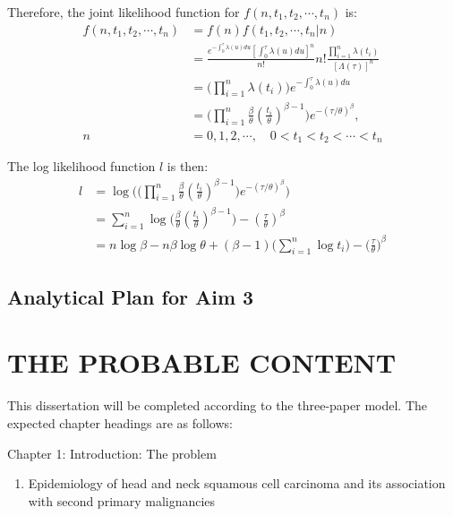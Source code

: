 \documentclass[12pt]{book}
\numberwithin{equation}{chapter}
\providecommand{\tightlist}{%
  \setlength{\itemsep}{0pt}\setlength{\parskip}{0pt}}
\begin{document}
Therefore, the joint likelihood function for \(f(n, t_1, t_2, \cdots, t_n)\) is:
\begin{equation}\label{pdftau}
\begin{aligned}
f(n, t_1, t_2, \cdots, t_n) & = f(n)f(t_1, t_2, \cdots, t_n|n)\\
& = \frac{e^{-\int_0^\tau \lambda(u)du}[\int_0^\tau \lambda(u)du]^n}{n!}n!\frac{\prod_{i=1}^n\lambda(t_i)}{[\Lambda(\tau)]^n}\\
& = \Big(\prod_{i=1}^n\lambda(t_i) \Big)e^{-\int_0^\tau \lambda(u)du}\\
& = \Big(\prod_{i=1}^n\frac{\beta}{\theta}(\frac{t_i}{\theta})^{\beta - 1} \Big)e^{-(\tau/\theta)^\beta},\\ 
n & = 0, 1, 2, \cdots, \quad  0 < t_1 < t_2 < \cdots < t_n
\end{aligned}
\end{equation}

The log likelihood function \(l\) is then:
\begin{equation}\label{logtau}
\begin{aligned}
l & = \log \Bigg(\Big(\prod_{i=1}^n\frac{\beta}{\theta}(\frac{t_i}{\theta})^{\beta - 1}\Big)e^{-(\tau/\theta)^\beta}\Bigg)\\
& = \sum_{i=1}^n\log\Big(\frac{\beta}{\theta}(\frac{t_i}{\theta})^{\beta - 1}\Big) - (\frac{\tau}{\theta})^\beta\\
& = n\log\beta - n\beta\log\theta + (\beta - 1)\bigg(\sum_{i=1}^n\log t_i\bigg) - \Big(\frac{\tau}{\theta}\Big)^\beta
\end{aligned}
\end{equation}

\hypertarget{analytical-plan-for-aim-3}{%
\section{Analytical Plan for Aim 3}\label{analytical-plan-for-aim-3}}

\hypertarget{the-probable-content}{%
\chapter{THE PROBABLE CONTENT}\label{the-probable-content}}

This dissertation will be completed according to the three-paper model. The expected chapter headings are as follows:

Chapter 1: Introduction: The problem

\begin{enumerate}
\def\labelenumi{\Alph{enumi}.}
\tightlist
\item
  Epidemiology of head and neck squamous cell carcinoma and its association with second primary malignancies
\end{enumerate}
\end{document}
